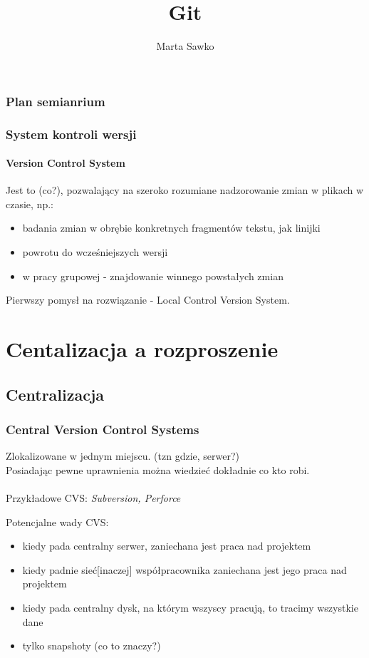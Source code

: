 \documentclass{beamer}
\title{Git}
\author{Marta Sawko}
\begin{document}
\frame{\titlepage}

\begin{frame}
 \frametitle{Plan semianrium}
 \tableofcontents
\end{frame}


\begin{frame}
 \frametitle{System kontroli wersji}
 \framesubtitle{\textbf{V}ersion \textbf{C}ontrol \textbf{S}ystem}
 Jest to (co?), pozwalający na szeroko rozumiane nadzorowanie zmian w plikach w czasie, np.:
 \begin{itemize}
  \item badania zmian w obrębie konkretnych fragmentów tekstu, jak linijki
  \item powrotu do wcześniejszych wersji 
  \item w pracy grupowej - znajdowanie winnego powstałych zmian
 \end{itemize} 
 Pierwszy pomysł na rozwiązanie - Local Control Version System.
\end{frame}

\section{Centalizacja a rozproszenie}
\subsection{Centralizacja}
\begin{frame}
 \frametitle{\textbf{C}entral \textbf{V}ersion Control \textbf{S}ystems}
  Zlokalizowane w jednym miejscu. (tzn gdzie, serwer?) \\
  Posiadając pewne uprawnienia można wiedzieć dokładnie co kto robi.\\
  [obrazek, fig 1.2]
  \\Przykładowe CVS: \textit{Subversion, Perforce}
\end{frame}

\begin{frame}
  Potencjalne wady CVS:
  \begin{itemize}
  \item kiedy pada centralny serwer, zaniechana jest praca nad projektem
  \item kiedy padnie sieć[inaczej] współpracownika zaniechana jest jego praca nad projektem
  \item kiedy pada centralny dysk, na którym wszyscy pracują, to tracimy wszystkie dane 
  \item tylko snapshoty (co to znaczy?)
 \end{itemize}
\end{frame}
\end{document}
